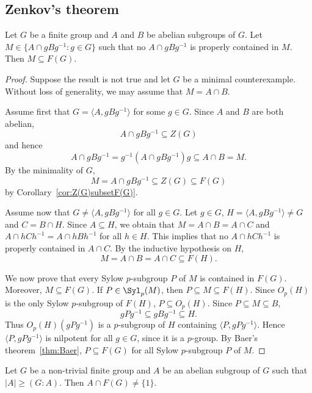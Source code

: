 \subsection{Zenkov's theorem}

\begin{theorem}[Zenkov]
    \label{thm:Zenkov}
    Let $G$ be a finite group and $A$ and $B$ be abelian subgroups of $G$. Let
    $M\in\{A\cap gBg^{-1}:g\in G\}$ such that no $A\cap gBg^{-1}$ is properly
    contained in $M$. Then $M\subseteq F(G)$.
\end{theorem}

\begin{proof}
    Suppose the result is not true and let $G$ be a minimal counterexample. 
	Without loss of generality, we may assume that $M=A\cap B$. 

	Assume first that $G=\langle A,gBg^{-1}\rangle$ for some $g\in G$. Since $A$
	and $B$ are both abelian, 
 \[
 A\cap gBg^{-1}\subseteq Z(G)
 \]
 and hence 
	\[
		A\cap gBg^{-1}=g^{-1}(A\cap gBg^{-1})g\subseteq A\cap B=M.
	\]
	By the minimality of $G$, 
    \[
    M=A\cap gBg^{-1}\subseteq Z(G)\subseteq F(G)
    \]
	by Corollary~\ref{cor:Z(G)subsetF(G)}.

	Assume now that $G\ne \langle A,gBg^{-1}\rangle$ for all $g\in G$.
	Let $g\in G$, $H=\langle A,gBg^{-1}\rangle\ne G$ and $C=B\cap H$.
	Since $A\subseteq H$, we obtain that 
 	$M=A\cap B=A\cap C$ and 
	$A\cap hCh^{-1}=A\cap hBh^{-1}$
	for all $h\in H$. This implies that no 
	$A\cap hCh^{-1}$ is properly contained in $A\cap C$. 
    By the inductive hypothesis on $H$, 
 	\[
		M=A\cap B=A\cap C\subseteq F(H).
	\]

    We now prove that every Sylow $p$-subgroup $P$ of $M$ is contained in $F(G)$. Moreover, 
    $M\subseteq F(G)$.
	If $P\in\Syl_p(M)$, then $P\subseteq M\subseteq F(H)$. Since $O_p(H)$ is 
    the only Sylow $p$-subgroup of $F(H)$, $P\subseteq O_p(H)$. Since 
	$P\subseteq M\subseteq B$, 
	\[
	gPg^{-1}\subseteq gBg^{-1}\subseteq H.
	\]
	Thus $O_p(H)(gPg^{-1})$ is a $p$-subgroup of $H$ containing 
	$\langle P,gPg^{-1}\rangle$. Hence $\langle P,gPg^{-1}\rangle$
	is nilpotent for all $g\in G$, since it is a $p$-group. By Baer's theorem~\ref{thm:Baer}, 
    $P\subseteq F(G)$ for all Sylow $p$-subgroup $P$ of $M$. 
\end{proof}

\begin{corollary}
	\label{cor:Zenkov}
	Let $G$ be a non-trivial finite group and $A$ be an abelian subgroup of $G$ such that 
 	$|A|\geq(G:A)$. Then $A\cap F(G)\ne\{1\}$.
\end{corollary}

